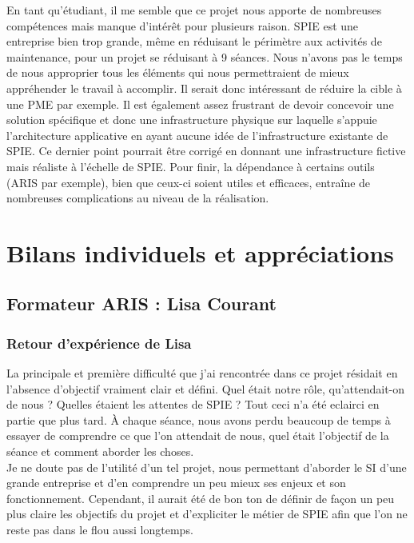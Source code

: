 En tant qu’étudiant, il me semble que ce projet nous apporte de nombreuses compétences mais manque d’intérêt pour plusieurs raison. SPIE est une entreprise bien trop grande, même en réduisant le périmètre aux activités de maintenance, pour un projet se réduisant à 9 séances. Nous n’avons pas le temps de nous approprier tous les éléments qui nous permettraient de mieux appréhender le travail à accomplir. Il serait donc intéressant de réduire la cible à une PME par exemple. Il est également assez frustrant de devoir concevoir une solution spécifique et donc une infrastructure physique sur laquelle s’appuie l’architecture applicative en ayant aucune idée de l’infrastructure existante de SPIE. Ce dernier point pourrait être corrigé en donnant une infrastructure fictive mais réaliste à l’échelle de SPIE. Pour finir, la dépendance à certains outils (ARIS par exemple), bien que ceux-ci soient utiles et efficaces, entraîne de nombreuses complications au niveau de la réalisation.

\section{Bilans individuels et appréciations}

\subsection{Formateur ARIS : Lisa Courant}

\subsubsection{Retour d'expérience de Lisa}

La principale et première difficulté que j’ai rencontrée dans ce projet résidait en l’absence d’objectif vraiment clair et défini. Quel était notre rôle, qu’attendait-on de nous ? Quelles étaient les attentes de SPIE ? Tout ceci n’a été eclairci en partie que plus tard. À chaque séance, nous avons perdu beaucoup de temps à essayer de comprendre ce que l’on attendait de nous, quel était l’objectif de la séance et comment aborder les choses. \\

Je ne doute pas de l’utilité d’un tel projet, nous permettant d’aborder le SI d’une grande entreprise et d’en comprendre un peu mieux ses enjeux et son fonctionnement. Cependant, il aurait été de bon ton de définir de façon un peu plus claire les objectifs du projet et d’expliciter le métier de SPIE afin que l’on ne reste pas dans le flou aussi longtemps. \\

